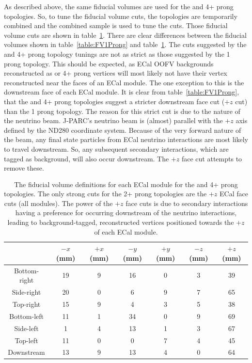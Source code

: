 As described above, the same fiducial volumes are used for the  and 4+ prong topologies.  So, to tune the fiducial volume cuts, the topologies are temporarily combined and the combined sample is used to tune the cuts.  Those fiducial volume cuts are shown in table~\ref{table:FV2+Prong}.  There are clear differences between the fiducial volumes shown in table~\ref{table:FV1Prong} and table~\ref{table:FV2+Prong}.  The cuts suggested by the  and 4+ prong topology tunings are not as strict as those suggested by the 1 prong topology.  This should be expected, as ECal OOFV backgrounds reconstructed as  or 4+ prong vertices will most likely not have their vertex reconstructed near the faces of an ECal module.  The one exception to this is the downstream face of each ECal module.  It is clear from table~\ref{table:FV1Prong}, that the  and 4+ prong topologies suggest a stricter downstream face cut ($+z$ cut) than the 1 prong topology.  The reason for this strict cut is due to the nature of the neutrino beam.  J-PARC's neutrino beam is (almost) parallel with the $+z$ axis defined by the ND280 coordinate system.  Because of the very forward nature of the beam, any final state particles from ECal neutrino interactions are most likely to travel downstream.  So, any subsequent secondary interactions, which are tagged as background, will also occur downstream.  The $+z$ face cut attempts to remove these.
\begin{table}[b!]
  \begin{tabular}{ c c c c c c c }
     & $-x$ (mm) & $+x$ (mm) & $-y$ (mm) & $+y$ (mm) & $-z$ (mm) & $+z$ (mm)  \\ \hline \hline
    Bottom-right & 19 & 9 & 16 & 0 & 3 & 39 \\
    Side-right & 20 & 0 & 6 & 9 & 7 & 65 \\
    Top-right & 15 & 9 & 4 & 3 & 5 & 38 \\
    Bottom-left & 11 & 1 & 34 & 0 & 9 & 69 \\
    Side-left & 1 & 4 & 13 & 1 & 3 & 67 \\
    Top-left & 11 & 0 & 0 & 7 & 4 & 45 \\
    Downstream & 13 & 9 & 13 & 4 & 0 & 64  \\
  \end{tabular}
  \caption{The fiducial volume definitions for each ECal module for the  and 4+ prong topologies.  The only strong cuts for the 2+ prong topologies are the $+z$ ECal face cuts (all modules).  The power of the $+z$ face cuts is due to secondary interactions having a preference for occurring downstream of the neutrino interactions, leading to background-tagged, reconstructed vertices positioned towards the $+z$ of each ECal module.}
  \label{table:FV2+Prong}
\end{table}
